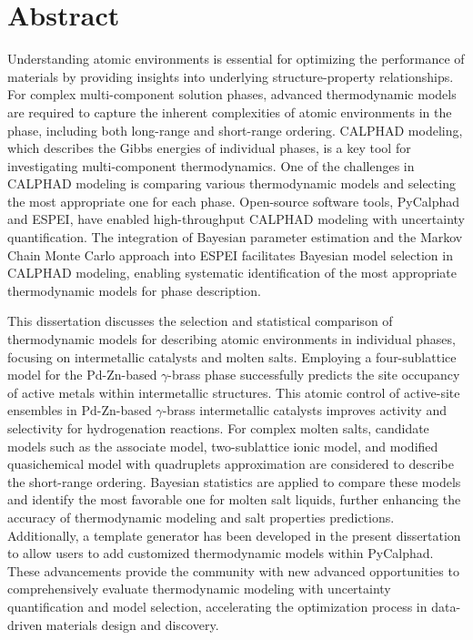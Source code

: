 \documentclass[letterpaper, 12pt]{report}
\begin{document}
\vfill

\newpage
\chapter*{Abstract}
Understanding atomic environments is essential for optimizing the performance of materials by providing insights into underlying structure-property relationships. For complex multi-component solution phases, advanced thermodynamic models are required to capture the inherent complexities of atomic environments in the phase, including both long-range and short-range ordering. CALPHAD modeling, which describes the Gibbs energies of individual phases, is a key tool for investigating multi-component thermodynamics. One of the challenges in CALPHAD modeling is comparing various thermodynamic models and selecting the most appropriate one for each phase. Open-source software tools, PyCalphad and ESPEI, have enabled high-throughput CALPHAD modeling with uncertainty quantification. The integration of Bayesian parameter estimation and the Markov Chain Monte Carlo approach into ESPEI facilitates Bayesian model selection in CALPHAD modeling, enabling systematic identification of the most appropriate thermodynamic models for phase description.

This dissertation discusses the selection and statistical comparison of thermodynamic models for describing atomic environments in individual phases, focusing on intermetallic catalysts and molten salts. Employing a four-sublattice model for the Pd-Zn-based $\gamma$-brass phase successfully predicts the site occupancy of active metals within intermetallic structures. This atomic control of active-site ensembles in Pd-Zn-based $\gamma$-brass intermetallic catalysts improves activity and selectivity for hydrogenation reactions. For complex molten salts, candidate models such as the associate model, two-sublattice ionic model, and modified quasichemical model with quadruplets approximation are considered to describe the short-range ordering. Bayesian statistics are applied to compare these models and identify the most favorable one for molten salt liquids, further enhancing the accuracy of thermodynamic modeling and salt properties predictions. Additionally, a template generator has been developed in the present dissertation to allow users to add customized thermodynamic models within PyCalphad. These advancements provide the community with new advanced opportunities to comprehensively evaluate thermodynamic modeling with uncertainty quantification and model selection, accelerating the optimization process in data-driven materials design and discovery.
\end{document}
